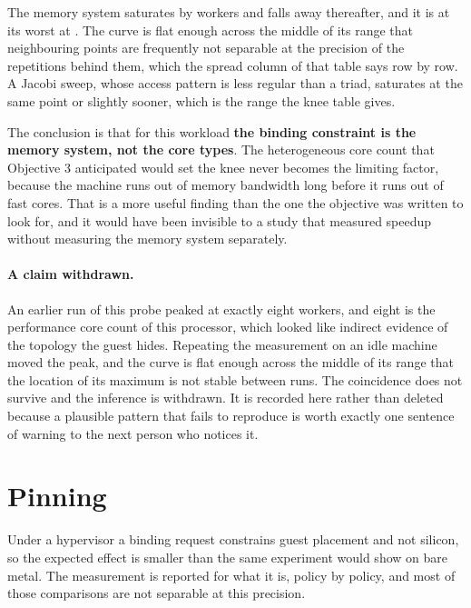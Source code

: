 The memory system saturates by \pnlTriadPeakWorkers{} workers and falls away
thereafter, and it is at its worst at \pnlTriadFloorWorkers{}. The curve is flat
enough across the middle of its range that neighbouring points are frequently
not separable at the precision of the repetitions behind them, which the spread
column of that table says row by row. A Jacobi sweep, whose access pattern is
less regular than a triad, saturates at the same point or slightly sooner, which
is the range the knee table gives.

The conclusion is that for this workload \textbf{the binding constraint is the
memory system, not the core types}. The heterogeneous core count that Objective 3
anticipated would set the knee never becomes the limiting factor, because the
machine runs out of memory bandwidth long before it runs out of fast cores. That
is a more useful finding than the one the objective was written to look for, and
it would have been invisible to a study that measured speedup without measuring
the memory system separately.

\paragraph{A claim withdrawn.} An earlier run of this probe peaked at exactly
eight workers, and eight is the performance core count of this processor, which
looked like indirect evidence of the topology the guest hides. Repeating the
measurement on an idle machine moved the peak, and the curve is flat enough
across the middle of its range that the location of its maximum is not stable
between runs. The coincidence does not survive and the inference is withdrawn.
It is recorded here rather than deleted because a plausible pattern that fails to
reproduce is worth exactly one sentence of warning to the next person who notices
it.

\section{Pinning}





Under a hypervisor a binding request constrains guest placement and not silicon,
so the expected effect is smaller than the same experiment would show on bare
metal. The measurement is reported for what it is, policy by policy, and most of
those comparisons are not separable at this precision.

